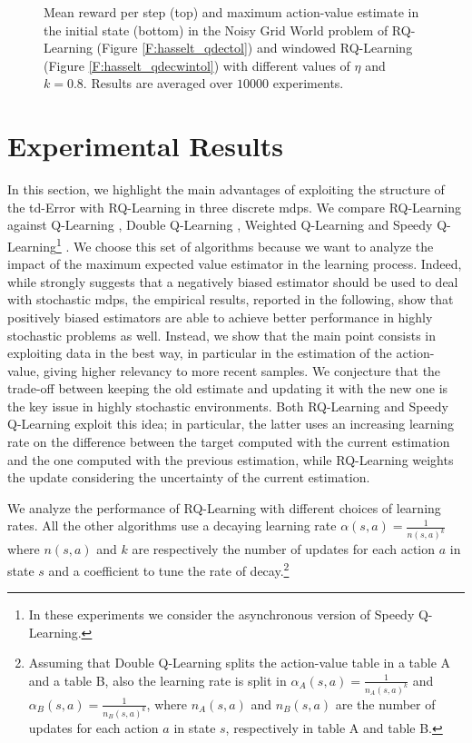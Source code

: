 \begin{figure}[t]
\begin{minipage}{\columnwidth}
\end{minipage}
  \caption[Noisy grid world RQ-Learning variants comparison - 2]{Mean reward per step (top) and maximum action-value estimate in the initial state (bottom) in the Noisy Grid World problem of RQ-Learning (Figure \ref{F:hasselt_qdectol}) and windowed RQ-Learning (Figure \ref{F:hasselt_qdecwintol}) with different values of $\eta$ and $k = 0.8$. Results are averaged over $10000$ experiments.}
  \label{F:hasselt_QDecTol}
\end{figure}

\section{Experimental Results}\label{S:empirical}
In this section, we highlight the main advantages of exploiting the structure of the \gls{td}-Error with RQ-Learning in three discrete \glspl{mdp}. We compare RQ-Learning against Q-Learning \cite{watkins1989learning}, Double Q-Learning \cite{van2010double}, Weighted Q-Learning \cite{deramo2016estimating} and Speedy Q-Learning\footnote{In these experiments we consider the asynchronous version of Speedy Q-Learning.} \cite{NIPS2011_4251}. We choose this set of algorithms because we want to analyze the impact of the maximum expected value estimator in the learning process. Indeed, while \cite{van2010double} strongly suggests that a negatively biased estimator should be used to deal with stochastic \glspl{mdp}, the  empirical results, reported in the following, show that positively biased estimators are able to achieve better performance in highly stochastic problems as well. Instead, we show that the main point consists in exploiting data in the best way, in particular in the estimation of the action-value, giving higher relevancy to more recent samples. We conjecture that the trade-off between keeping the old estimate and updating it with the new one is the key issue in highly stochastic environments. Both RQ-Learning and Speedy Q-Learning exploit this idea; in particular, the latter uses an increasing learning rate on the difference between the target computed with the current estimation and the one computed with the previous estimation, while RQ-Learning weights the update considering the uncertainty of the current estimation.

We analyze the performance of RQ-Learning with different choices of learning rates. All the other algorithms use a decaying learning rate $\alpha(s, a) = \frac{1}{n(s, a)^{k}}$ where $n(s, a)$ and $k$ are respectively the number of updates for each action $a$ in state $s$ and a coefficient to tune the rate of decay.\footnote{Assuming that Double Q-Learning splits the action-value table in a table A and a table B, also the learning rate is split in $\alpha_A(s, a) = \frac{1}{n_A(s, a)^{k}}$ and $\alpha_B(s, a) = \frac{1}{n_B(s, a)^{k}}$, where $n_A(s, a)$ and $n_B(s, a)$ are the number of updates for each action $a$ in state $s$, respectively in table A and table B.}

